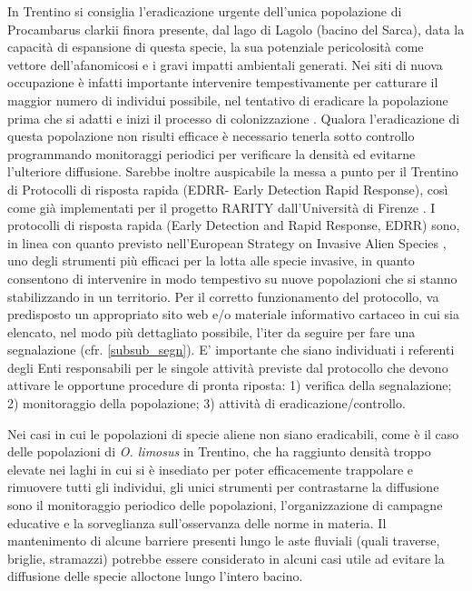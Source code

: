 \documentclass[11pt,a4paper,italian,twoside,openany]{memoir}
\begin{document}
In Trentino si consiglia l'eradicazione urgente dell'unica popolazione di Procambarus clarkii finora presente, dal lago di Lagolo (bacino del Sarca), data la capacità di espansione di questa specie, la sua potenziale pericolosità come vettore dell'afanomicosi e i gravi impatti ambientali generati. Nei siti di nuova occupazione è infatti importante intervenire tempestivamente per catturare il maggior numero di individui possibile, nel tentativo di eradicare la popolazione prima che si adatti e inizi il processo di colonizzazione \cite{Zanetti 2014}. Qualora l'eradicazione di questa popolazione non risulti efficace è necessario tenerla sotto controllo programmando monitoraggi periodici per verificare la densità ed evitarne l'ulteriore diffusione.
Sarebbe inoltre auspicabile la messa a punto per il Trentino di Protocolli di risposta rapida (EDRR- Early Detection Rapid Response), così come già implementati per il progetto RARITY dall'Università di Firenze \cite{Zanetti 2014c}. I protocolli di risposta rapida (Early Detection and Rapid Response, EDRR) sono, in linea con quanto previsto nell'European Strategy on Invasive Alien Species \cite{Genovesi 2004}, uno degli strumenti più efficaci per la lotta alle specie invasive, in quanto consentono di intervenire in modo tempestivo su nuove popolazioni che si stanno stabilizzando in un territorio. Per il corretto funzionamento del protocollo, va predisposto un appropriato sito web e/o materiale informativo cartaceo \cite{RARITY} in cui sia elencato, nel modo più dettagliato possibile, l'iter da seguire per fare una segnalazione (cfr. \ref{subsub_segn}). E' importante che siano individuati i referenti degli Enti responsabili per le singole attività previste dal protocollo \cite{Zanetti 2014b} che devono attivare le opportune procedure di pronta riposta: 1) verifica della segnalazione; 2) monitoraggio della popolazione; 3) attività di eradicazione/controllo.

Nei casi in cui le popolazioni di specie aliene non siano eradicabili, come è il caso delle popolazioni di \emph{O. limosus} in Trentino, che ha raggiunto densità troppo elevate nei laghi in cui si è insediato per poter efficacemente trappolare e rimuovere tutti gli individui, gli unici strumenti per contrastarne la diffusione sono il monitoraggio periodico delle popolazioni, l'organizzazione di campagne educative e la sorveglianza sull'osservanza delle norme in materia. Il mantenimento di alcune barriere presenti lungo le aste fluviali (quali traverse, briglie, stramazzi) potrebbe essere considerato in alcuni casi utile ad evitare la diffusione delle specie alloctone lungo l'intero bacino. 
\end{document}
